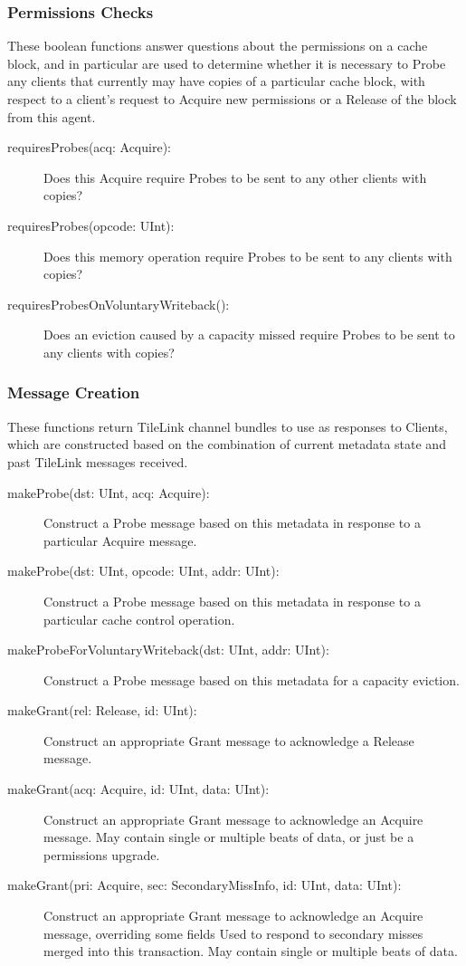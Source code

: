\subsubsection{Permissions Checks}

These boolean functions answer questions about the permissions on a cache block,
and in particular are used to determine whether it is necessary to Probe any
clients that currently may have copies of a particular cache block,
with respect to a client's request to Acquire new permissions or a
Release of the block from this agent.

\begin{description}
\item[requiresProbes(acq: Acquire):]
Does this Acquire require Probes to be sent to any other clients with copies?
\item[requiresProbes(opcode: UInt):]
Does this memory operation require Probes to be sent to any clients with copies?
\item[requiresProbesOnVoluntaryWriteback():]
Does an eviction caused by a capacity missed require Probes to be sent to any clients with copies?
\end{description}

\subsubsection{Message Creation}

These functions return TileLink channel bundles to use as responses to Clients,
which are constructed  based on the combination of current metadata state and 
past TileLink messages received.

\begin{description}
\item[makeProbe(dst: UInt, acq: Acquire):]
Construct a Probe message based on this metadata in response to a particular Acquire message.
\item[makeProbe(dst: UInt, opcode: UInt, addr: UInt):]
Construct a Probe message  based on this metadata in response to a particular cache control operation.
\item[makeProbeForVoluntaryWriteback(dst: UInt, addr: UInt):]
Construct a Probe message based on this metadata for a capacity eviction.
\item[makeGrant(rel: Release, id: UInt):]
Construct an appropriate Grant message to acknowledge a Release message.
\item[makeGrant(acq: Acquire, id: UInt, data: UInt):]
Construct an appropriate Grant message to acknowledge an Acquire message.
May contain single or multiple beats of data, or just be a permissions upgrade.
\item[makeGrant(pri: Acquire, sec: SecondaryMissInfo, id: UInt, data: UInt):]
Construct an appropriate Grant message to acknowledge an Acquire message, overriding some fields
Used to respond to secondary misses merged into this transaction.
May contain single or multiple beats of data.
\end{description}

